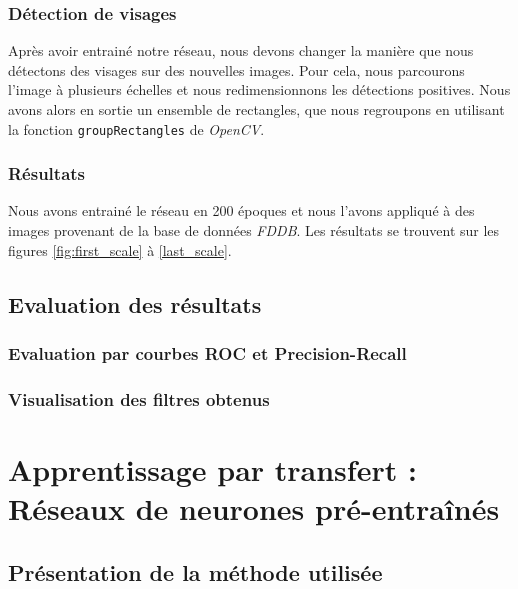 \documentclass[a4paper,11pt]{article}
\begin{document}
\subsubsection{Détection de visages}
    
    Après avoir entrainé notre réseau, nous devons changer la manière que nous détectons des visages sur des nouvelles images.
    Pour cela, nous parcourons l'image à plusieurs échelles et nous redimensionnons les détections positives.
    Nous avons alors en sortie un ensemble de rectangles, que nous regroupons en utilisant la fonction \verb$groupRectangles$ de \textit{OpenCV}.

\subsubsection{Résultats}

    Nous avons entrainé le réseau en 200 époques et nous l'avons appliqué à des images provenant de la base de données \textit{FDDB}.
    Les résultats se trouvent sur les figures \ref{fig:first_scale} à \ref{last_scale}.


\subsection{Evaluation des résultats}
\subsubsection{Evaluation par courbes ROC et Precision-Recall}
\subsubsection{Visualisation des filtres obtenus}

\section{Apprentissage par transfert : Réseaux de neurones pré-entraînés}
\subsection{Présentation de la méthode utilisée}
\label{sec:transfert_learning}
\end{document}
